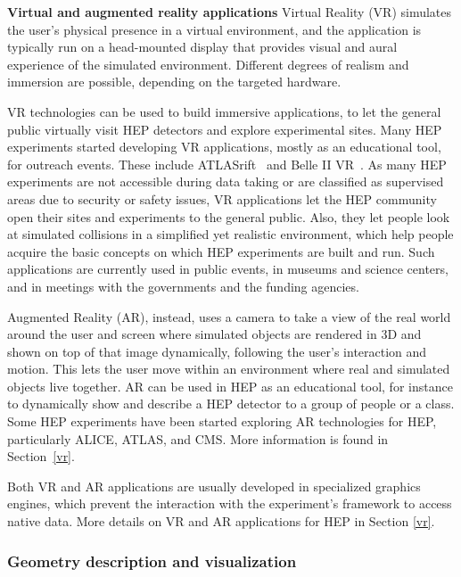 \documentclass[12pt,a4paper]{article}
\begin{document}
{\bf Virtual and augmented reality applications} Virtual Reality (VR) simulates the user’s physical presence in a virtual environment,
and the application is typically run on a head-mounted display that provides visual and aural experience of the simulated environment.
Different degrees of realism and immersion are possible, depending on the targeted hardware.

VR technologies can be used to build immersive applications, to let the general public virtually visit HEP detectors and explore
experimental sites. Many HEP experiments started developing VR applications, mostly as an educational tool, for outreach events.
These include ATLASrift~\cite{ATLASRift} and Belle II VR~\cite{BelleIIVR}.
As many HEP experiments are not accessible during data taking or are classified as supervised areas due to security or safety issues,
VR applications let the HEP community open their sites and experiments to the general public. Also,
they let people look at simulated  collisions in a simplified yet realistic environment, which help people acquire the basic
concepts on which HEP experiments are built and run. Such applications are currently used in public events,
in museums and science centers, and in meetings with the governments and the funding agencies.

Augmented Reality (AR), instead, uses a camera to take a view of the real world around the user and screen where simulated
objects are rendered in 3D and shown on top of that image dynamically, following the user's interaction and motion.
This lets the user move within an environment where real and simulated objects live together. AR can be used in HEP as
an educational tool, for instance to dynamically show and describe a HEP detector to a group of people or a class.
Some HEP experiments have been started exploring AR technologies for HEP, particularly ALICE, ATLAS, and CMS. More information
is found in Section~\ref{vr}.

Both VR and AR applications are usually developed in specialized graphics engines, which prevent the interaction
with the experiment's framework to access native data. More details on VR and AR applications for HEP in Section \ref{vr}.


\hypertarget{geometry-description}{%
\subsubsection{Geometry description and visualization}\label{geometry-description}}
\end{document}
